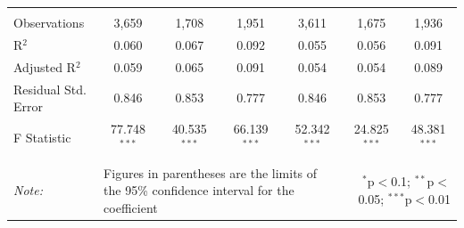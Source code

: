 \documentclass[alpha-refs]{wiley-article-01g}
\begin{document}
\begin{landscape}
\begin{table}[!htbp]
\begin{tabular}{@{\extracolsep{5pt}}lcccccc}
  & & & & & & \\ 
\hline \\[-3ex] 
Observations & 3,659 & 1,708 & 1,951 & 3,611 & 1,675 & 1,936 \\ 
R$^{2}$ & 0.060 & 0.067 & 0.092 & 0.055 & 0.056 & 0.091 \\ 
Adjusted R$^{2}$ & 0.059 & 0.065 & 0.091 & 0.054 & 0.054 & 0.089 \\ 
Residual Std. Error & 0.846 & 0.853 & 0.777 & 0.846 & 0.853 & 0.777 \\ 
F Statistic & 77.748$^{***}$ & 40.535$^{***}$ & 66.139$^{***}$ & 52.342$^{***}$ & 24.825$^{***}$ & 48.381$^{***}$ \\ 
\hline 
\hline \\[-3ex] 
\textit{Note:} &\multicolumn{4}{l}{Figures in parentheses are the limits of the 95\% confidence interval for the coefficient}  & \multicolumn{2}{r}{$^{*}$p$<$0.1; $^{**}$p$<$0.05; $^{***}$p$<$0.01} \\ 
\end{tabular} 
\end{table} 

\end{landscape}

\newpage
\end{document}
